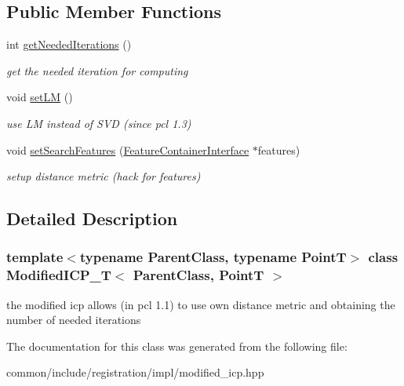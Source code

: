 \subsection*{Public Member Functions}
\begin{DoxyCompactItemize}
\item 
\hypertarget{classModifiedICP__T_a8010f52f6d5b496b33054094275110c2}{
int \hyperlink{classModifiedICP__T_a8010f52f6d5b496b33054094275110c2}{getNeededIterations} ()}
\label{classModifiedICP__T_a8010f52f6d5b496b33054094275110c2}

\begin{DoxyCompactList}\small\item\em get the needed iteration for computing \item\end{DoxyCompactList}\item 
\hypertarget{classModifiedICP__T_af010b080c2eb34971ecbdf2b2d356ad2}{
void \hyperlink{classModifiedICP__T_af010b080c2eb34971ecbdf2b2d356ad2}{setLM} ()}
\label{classModifiedICP__T_af010b080c2eb34971ecbdf2b2d356ad2}

\begin{DoxyCompactList}\small\item\em use LM instead of SVD (since pcl 1.3) \item\end{DoxyCompactList}\item 
\hypertarget{classModifiedICP__T_a508debe53bec7d8119cd26238d72b768}{
void \hyperlink{classModifiedICP__T_a508debe53bec7d8119cd26238d72b768}{setSearchFeatures} (\hyperlink{classFeatureContainerInterface}{FeatureContainerInterface} $\ast$features)}
\label{classModifiedICP__T_a508debe53bec7d8119cd26238d72b768}

\begin{DoxyCompactList}\small\item\em setup distance metric (hack for features) \item\end{DoxyCompactList}\end{DoxyCompactItemize}


\subsection{Detailed Description}
\subsubsection*{template$<$typename ParentClass, typename PointT$>$ class ModifiedICP\_\-T$<$ ParentClass, PointT $>$}

the modified icp allows (in pcl 1.1) to use own distance metric and obtaining the number of needed iterations 

The documentation for this class was generated from the following file:\begin{DoxyCompactItemize}
\item 
common/include/registration/impl/modified\_\-icp.hpp\end{DoxyCompactItemize}
